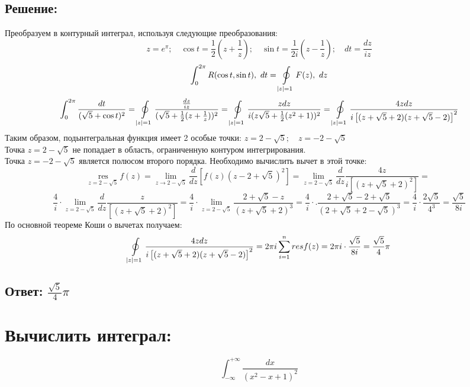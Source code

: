 \documentclass{article}
\begin{document}
	\subsection{Решение:}
	Преобразуем в контурный интеграл, используя следующие преобразования:
	\[
		z = e^{\pi}; \quad \cos{t}= \frac{1}{2}\left( z + \frac{1}{z}\right); \quad \sin
		{t}= \frac{1}{2i}\left( z - \frac{1}{z}\right); \quad dt = \frac{dz}{iz}
	\]
	\[
		\int_{0}^{2\pi}R(\cos{t}, \sin{t}) ,\ dt = \ointop_{|z| = 1}F(z) ,\ dz
	\]
	\[
		\int_{0}^{2\pi}\frac{dt}{(\sqrt{5}+ \cos{t})^{2}}= \ointop_{|z| = 1}\frac{\frac{dz}{iz}}{(\sqrt{5}+
		\frac{{1}}{2}(z + \frac{1}{z}))^{2}}= \ointop_{|z| = 1}\frac{zdz}{i(z\sqrt{5}+
		\frac{1}{2}(z^{2} + 1))^{2}}= \ointop_{|z| = 1}\frac{4zdz}{i \left[(z + \sqrt{5}+
		2) (z + \sqrt{5}- 2)\right]^{2}}
	\]
	Таким образом, подынтегральная функция имеет 2 особые точки: $z = 2 - \sqrt{5};
	\quad z = -2 - \sqrt{5}$ \\ Точка $z = 2 - \sqrt{5}$ не попадает в область,
	ограниченную контуром интегрирования. \\ Точка $z = -2 - \sqrt{5}$ является полюсом
	второго порядка. Необходимо вычислить вычет в этой точке:
	\[
		\underset{z = 2 - \sqrt{5}}{\text{res}}\ f(z) = \lim\limits_{z\rightarrow 2 -
		\sqrt{5}}\frac{d}{dz}\left[ f(z)(z - 2 + \sqrt{5})^{2}\right] = \lim\limits_{z
		= 2 - \sqrt{5}}\frac{d}{dz}\frac{4z}{i \left[(z + \sqrt{5}+2)^{2} \right] }=
	\]
	\[
		\frac{4}{i}\cdot \lim\limits_{z = 2 - \sqrt{5}}\frac{d}{dz}\frac{z}{ \left[(z
		+ \sqrt{5}+2)^{2} \right] }= \frac{4}{i}\cdot \lim\limits_{z = 2 - \sqrt{5}}\frac{2
		+ \sqrt{5} - z}{ (z + \sqrt{5}+2)^{3} }= \frac{4}{i}\cdot.\frac{2 + \sqrt{5}
		- 2 + \sqrt{5}}{ (2 + \sqrt{5}+2 - \sqrt{5})^{3} }= \frac{4}{i}\cdot\frac{2\sqrt{5}}{4^{3}}
		= \frac{\sqrt{5}}{8i}
	\]
	По основной теореме Коши о вычетах получаем:
	\[
		\ointop_{|z| = 1}\frac{4zdz}{i \left[(z + \sqrt{5}+ 2) (z + \sqrt{5}- 2)\right]^{2}}
		= 2\pi i \sum\limits_{i = 1}^{n}resf(z) = 2\pi i \cdot \frac{\sqrt{5}}{8i}= \frac{\sqrt{5}}{4}
		\pi
	\]
	\subsection{Ответ: $\frac{\sqrt{5}}{4}\pi$}

	\vspace{1cm}

	\section{Вычислить интеграл: }
	\[
		\int_{-\infty}^{+\infty}\frac{dx}{(x^{2} - x + 1)^{2}}
	\]
\end{document}
